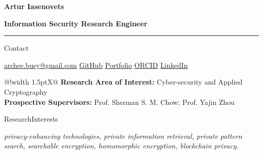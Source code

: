 \documentclass[11pt,a4paper]{article}
\newcommand{\cvrow}[2]{%
  \noindent
  \begin{minipage}[t]{0.145\textwidth}
    \vspace{0pt}%
    \raggedright
    \fontsize{10.5}{12.5}\selectfont
    #1
  \end{minipage}%
  \hfill
  \begin{minipage}[t]{0.835\textwidth}
    \vspace{0pt}%
    #2
  \end{minipage}\par
}
\begin{document}
{\fontsize{24}{28}\selectfont\bfseries Artur Iasenovets}\par
\vspace{0.08em}
{\large\bfseries Information Security Research Engineer}\par
\vspace{0.22em}
\hrule
\vspace{0.55em}

\cvrow{Contact}{%
  \href{mailto:archee.busy@gmail.com}{archee.busy@gmail.com}
  \;\textbullet\;
  \href{https://github.com/iasenovets}{GitHub}
  \;\textbullet\;
  \href{https://iasenovets.github.io/}{Portfolio}
  \;\textbullet\;
  \href{https://orcid.org/0009-0008-0008-3746}{ORCID}
  \;\textbullet\;
  \href{https://linkedin.com/in/iasenovets}{LinkedIn}
}

\vspace{0.55em}

\noindent\hfill
\begin{minipage}[t]{0.835\textwidth}
  \vspace{0pt}%
  \begin{tabularx}{\linewidth}
    {@{}!{\color{linkblue}\vrule width 1.5pt\hspace{0.70em}}X@{}}
    \textbf{Research Area of Interest:} Cyber-security and Applied Cryptography\\[0.18em]
    \textbf{Prospective Supervisors:} Prof. Sherman S. M. Chow; Prof. Yajin Zhou
  \end{tabularx}
\end{minipage}\par

\vspace{0.55em}

\cvrow{Research\newline Interests}{%
  \textit{privacy-enhancing technologies, private information retrieval, private pattern search,
  searchable encryption, homomorphic encryption, blockchain privacy.}
}

\vspace{0.75em}
\end{document}
